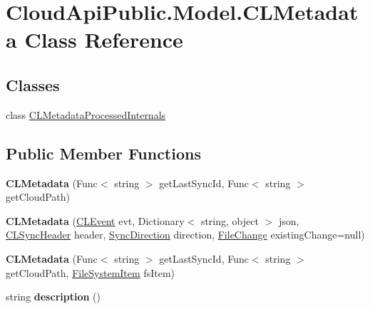 \hypertarget{class_cloud_api_public_1_1_model_1_1_c_l_metadata}{\section{Cloud\-Api\-Public.\-Model.\-C\-L\-Metadata Class Reference}
\label{class_cloud_api_public_1_1_model_1_1_c_l_metadata}
}
\subsection*{Classes}
\begin{DoxyCompactItemize}
\item 
class \hyperlink{class_cloud_api_public_1_1_model_1_1_c_l_metadata_1_1_c_l_metadata_processed_internals}{C\-L\-Metadata\-Processed\-Internals}
\end{DoxyCompactItemize}
\subsection*{Public Member Functions}
\begin{DoxyCompactItemize}
\item 
\hypertarget{class_cloud_api_public_1_1_model_1_1_c_l_metadata_a48818ae36598a5a1e9c933302123439d}{{\bfseries C\-L\-Metadata} (Func$<$ string $>$ get\-Last\-Sync\-Id, Func$<$ string $>$ get\-Cloud\-Path)}\label{class_cloud_api_public_1_1_model_1_1_c_l_metadata_a48818ae36598a5a1e9c933302123439d}

\item 
\hypertarget{class_cloud_api_public_1_1_model_1_1_c_l_metadata_add09db17029e075aafe4b500e0e6dbea}{{\bfseries C\-L\-Metadata} (\hyperlink{class_cloud_api_public_1_1_model_1_1_c_l_event}{C\-L\-Event} evt, Dictionary$<$ string, object $>$ json, \hyperlink{class_cloud_api_public_1_1_model_1_1_c_l_sync_header}{C\-L\-Sync\-Header} header, \hyperlink{namespace_cloud_api_public_1_1_static_a8ba5d1f6d06fa058730616f021c8974f}{Sync\-Direction} direction, \hyperlink{class_cloud_api_public_1_1_model_1_1_file_change}{File\-Change} existing\-Change=null)}\label{class_cloud_api_public_1_1_model_1_1_c_l_metadata_add09db17029e075aafe4b500e0e6dbea}

\item 
\hypertarget{class_cloud_api_public_1_1_model_1_1_c_l_metadata_aa76e2c7e13047765ff16be35f30bc57c}{{\bfseries C\-L\-Metadata} (Func$<$ string $>$ get\-Last\-Sync\-Id, Func$<$ string $>$ get\-Cloud\-Path, \hyperlink{class_cloud_api_public_1_1_model_1_1_file_system_item}{File\-System\-Item} fs\-Item)}\label{class_cloud_api_public_1_1_model_1_1_c_l_metadata_aa76e2c7e13047765ff16be35f30bc57c}

\item 
\hypertarget{class_cloud_api_public_1_1_model_1_1_c_l_metadata_a41d312ce3f44dd97c51b00acaf4ac56f}{string {\bfseries description} ()}\label{class_cloud_api_public_1_1_model_1_1_c_l_metadata_a41d312ce3f44dd97c51b00acaf4ac56f}

\end{DoxyCompactItemize}
